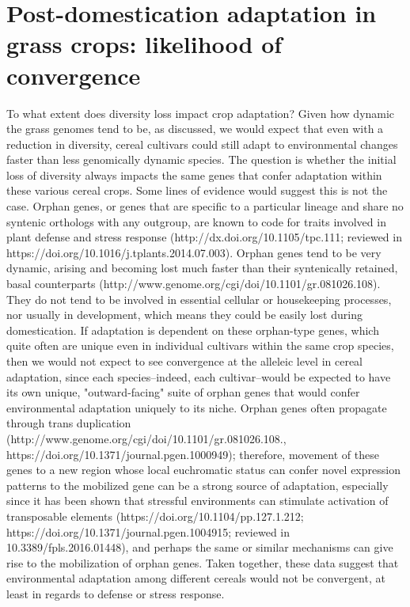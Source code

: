 \documentclass[12pt]{article}
\begin{document}
\section{Post-domestication adaptation in grass crops: likelihood of convergence}
To what extent does diversity loss impact crop adaptation? Given how dynamic the grass genomes tend to be, as discussed, we would expect that even with a reduction in diversity, cereal cultivars could still adapt to environmental changes faster than less genomically dynamic species. The question is whether the initial loss of diversity always impacts the same genes that confer adaptation within these various cereal crops. Some lines of evidence would suggest this is not the case. Orphan genes, or genes that are specific to a particular lineage and share no syntenic orthologs with any outgroup, are known to code for traits involved in plant defense and stress response (http://dx.doi.org/10.1105/tpc.111; reviewed in https://doi.org/10.1016/j.tplants.2014.07.003). Orphan genes tend to be very dynamic, arising and becoming lost much faster than their syntenically retained, basal counterparts (http://www.genome.org/cgi/doi/10.1101/gr.081026.108). They do not tend to be involved in essential cellular or housekeeping processes, nor usually in development, which means they could be easily lost during domestication. If adaptation is dependent on these orphan-type genes, which quite often are unique even in individual cultivars within the same crop species, then we would not expect to see convergence at the alleleic level in cereal adaptation, since each species--indeed, each cultivar--would be expected to have its own unique, "outward-facing" suite of orphan genes that would confer environmental adaptation uniquely to its niche. Orphan genes often propagate through trans duplication (http://www.genome.org/cgi/doi/10.1101/gr.081026.108., https://doi.org/10.1371/journal.pgen.1000949); therefore, movement of these genes to a new region whose local euchromatic status can confer novel expression patterns to the mobilized gene can be a strong source of adaptation, especially since it has been shown that stressful environments can stimulate activation of transposable elements (https://doi.org/10.1104/pp.127.1.212; https://doi.org/10.1371/journal.pgen.1004915; reviewed in 10.3389/fpls.2016.01448), and perhaps the same or similar mechanisms can give rise to the mobilization of orphan genes. Taken together, these data suggest that environmental adaptation among different cereals would not be convergent, at least in regards to defense or stress response.
\end{document}
